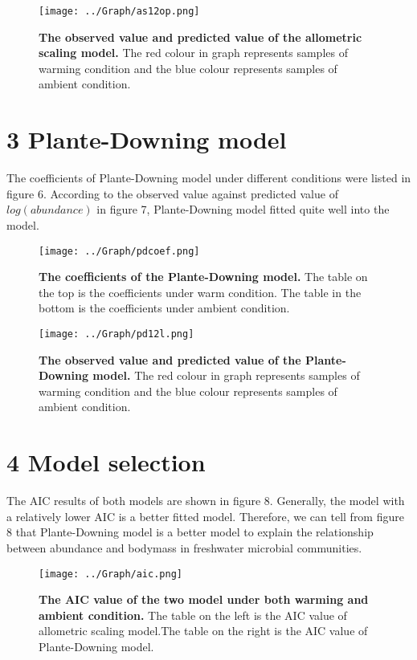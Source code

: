 \documentclass[11pt]{article}
\begin{document}
\begin{linenumbers}
\begin{figure}[H]
  \centering
  \texttt{[image: ../Graph/as12op.png]}
  \caption{\textbf{The observed value and predicted value of
  the allometric scaling model.}
  The red colour in graph represents samples of warming condition and the blue colour represents samples of ambient condition. }
\end{figure}

\section*{3 Plante-Downing model}
The coefficients of Plante-Downing model under different conditions were listed in figure 6. According to the observed value against predicted value of $log(abundance)$ in figure 7, Plante-Downing model fitted quite well into the model.



\begin{figure}[H]
  \centering
  \texttt{[image: ../Graph/pdcoef.png]}
  \caption{\textbf{The coefficients of the Plante-Downing model.}
   The table on the top is the coefficients under warm condition. The table in the bottom is the coefficients under ambient condition. }
\end{figure}

\begin{figure}[H]
  \centering
  \texttt{[image: ../Graph/pd12l.png]}
  \caption{\textbf{The observed value and predicted value of
  the Plante-Downing model.}
  The red colour in graph represents samples of warming condition and the blue colour represents samples of ambient condition. }
\end{figure}


\section*{4 Model selection}
The AIC results of both models are shown in figure 8. Generally, the model with a relatively lower AIC is a better fitted model. Therefore, we can tell from figure 8 that Plante-Downing model is a better model to explain the relationship between abundance and bodymass in freshwater microbial communities.


\begin{figure}[H]
  \centering
  \texttt{[image: ../Graph/aic.png]}
  \caption{\textbf{The AIC value of the two model under both warming and ambient condition.}
  The table on the left is the AIC value of allometric scaling model.The table on the right is the AIC value of Plante-Downing model. }
\end{figure}


\end{linenumbers}
\end{document}
